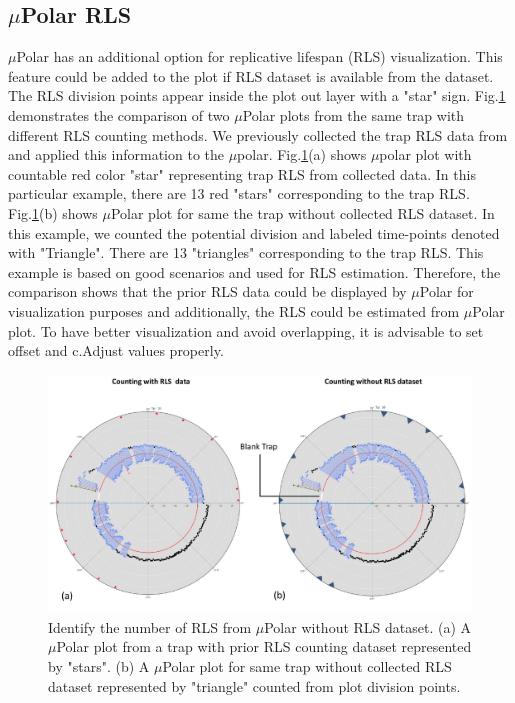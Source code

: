 \documentclass[conference]{IEEEtran}
\begin{document}
\subsection{$\mu$Polar RLS}

$\mu$Polar has an additional option for replicative lifespan (RLS) visualization. This feature could be added to the plot if RLS dataset is available from the dataset. The RLS division points appear inside the plot out layer with a "star" sign. Fig.\ref{fig:rls} demonstrates the comparison of two $\mu$Polar plots from the same trap with different RLS counting methods. We previously collected the trap RLS data from \cite{ref02.2} and applied this information to the $\mu$polar. Fig.\ref{fig:rls}(a) shows $\mu$polar plot with countable red color "star" representing trap RLS from collected data. In this particular example, there are 13 red "stars" corresponding to the trap RLS. Fig.\ref{fig:rls}(b) shows $\mu$Polar plot for same the trap without collected RLS dataset. In this example, we counted the potential division and labeled time-points denoted with "Triangle". There are 13 "triangles" corresponding to the trap RLS. This example is based on good scenarios and used for RLS estimation. Therefore, the comparison shows that the prior RLS data could be displayed by $\mu$Polar for visualization purposes and additionally, the RLS could be estimated from $\mu$Polar plot. To have better visualization and avoid overlapping, it is advisable to set offset and c.Adjust values properly.       


\begin{figure}
\centering
\includegraphics[width=\textwidth,height=10 cm]{Patterns/rls10.pdf}
\caption{ Identify the number of RLS from $\mu$Polar without RLS dataset. (a) A $\mu$Polar plot from a trap with prior RLS counting dataset represented by "stars". (b) A $\mu$Polar plot for same trap without collected RLS dataset represented by "triangle" counted from plot division points.}
\label{fig:rls}
\end{figure}
\end{document}
